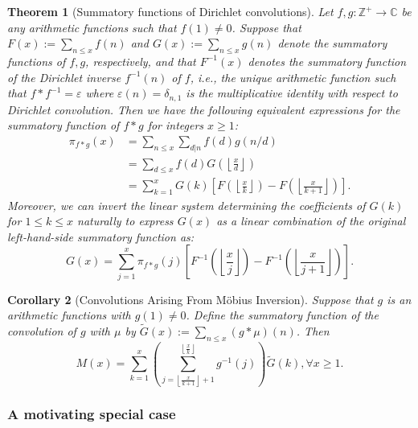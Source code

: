\documentclass[11pt,reqno,a4letter]{article}
\numberwithin{figure}{section}
\numberwithin{table}{section}
\newcommand{\floor}[1]{\left\lfloor #1 \right\rfloor}
\newcommand{\Floor}[2]{\ensuremath{\left\lfloor \frac{#1}{#2} \right\rfloor}}
\theoremstyle{plain}
\newtheorem{theorem}{Theorem}
\newtheorem{cor}[theorem]{Corollary}
\numberwithin{theorem}{section}
\theoremstyle{definition}
\begin{document}
\begin{theorem}[Summatory functions of Dirichlet convolutions] 
\label{theorem_SummatoryFuncsOfDirCvls} 
Let $f,g: \mathbb{Z}^{+} \rightarrow \mathbb{C}$ be any arithmetic functions such that $f(1) \neq 0$. 
Suppose that $F(x) := \sum_{n \leq x} f(n)$ and $G(x) := \sum_{n \leq x} g(n)$ denote the summatory 
functions of $f,g$, respectively, and that $F^{-1}(x)$ denotes the summatory function of the 
Dirichlet inverse $f^{-1}(n)$ of $f$, i.e., the unique arithmetic function such that 
$f \ast f^{-1} = \varepsilon$ where $\varepsilon(n) = \delta_{n,1}$ is the multiplicative identity 
with respect to Dirichlet convolution. Then we have the following equivalent expressions for the 
summatory function of $f \ast g$ for integers $x \geq 1$: 
\begin{align*} 
\pi_{f \ast g}(x) & = \sum_{n \leq x} \sum_{d|n} f(d) g(n/d) \\ 
     & = \sum_{d \leq x} f(d) G\left(\Floor{x}{d}\right) \\ 
     & = \sum_{k=1}^{x} G(k) \left[F\left(\Floor{x}{k}\right) - 
     F\left(\Floor{x}{k+1}\right)\right]. 
\end{align*} 
Moreover, we can invert the linear system determining the coefficients of $G(k)$ for $1 \leq k \leq x$ 
naturally to express $G(x)$ as a linear combination of the original left-hand-side summatory function as:
\[
G(x) = \sum_{j=1}^{x} \pi_{f \ast g}(j) \left[F^{-1}\left(\Floor{x}{j}\right) - 
     F^{-1}\left(\Floor{x}{j+1}\right)\right]. 
\]
\end{theorem} 

\begin{cor}[Convolutions Arising From M\"obius Inversion] 
\label{cor_CvlGAstMu} 
Suppose that $g$ is an arithmetic functions with $g(1) \neq 0$. Define the summatory function of 
the convolution of $g$ with $\mu$ by $\widetilde{G}(x) := \sum_{n \leq x} (g \ast \mu)(n)$. 
Then 
\[
M(x) = \sum_{k=1}^{x} \left(\sum_{j=\floor{\frac{x}{k+1}}+1}^{\floor{\frac{x}{k}}} g^{-1}(j)\right) 
     \widetilde{G}(k), \forall x \geq 1. 
\]
\end{cor} 

\subsubsection{A motivating special case} 
\label{example_InvertingARecRelForMx_Intro}
 
\end{document}
